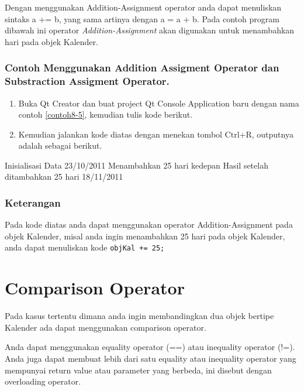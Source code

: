 Dengan menggunakan Addition-Assignment operator anda dapat menuliskan
sintaks a += b, yang sama artinya dengan a = a + b. Pada contoh program
dibawah ini operator \emph{Addition-Assignment} akan digunakan untuk
menambahkan hari pada objek Kalender.

\subsubsection*{Contoh Menggunakan Addition Assigment Operator dan Substraction Assigment Operator.}

\begin{enumerate}

\item
 Buka Qt Creator dan buat project Qt Console Application baru dengan
 nama contoh \ref{contoh8-5}, kemudian tulis kode berikut.




\item
 Kemudian jalankan kode diatas dengan menekan tombol Ctrl+R, outputnya
 adalah sebagai berikut.
\end{enumerate}

\begin{lcverbatim}
Inisialisasi Data
23/10/2011
Menambahkan 25 hari kedepan
Hasil setelah ditambahkan 25 hari
18/11/2011
\end{lcverbatim}

\subsubsection*{Keterangan}

Pada kode diatas anda dapat menggunakan operator Addition-Assignment
pada objek Kalender, misal anda ingin menambahkan 25 hari pada objek
Kalender, anda dapat menuliskan kode \texttt{objKal\ +=\ 25;}

\section{Comparison Operator}\label{comparison-operator}

Pada kasus tertentu dimana anda ingin membandingkan dua objek bertipe
Kalender ada dapat menggunakan comparison operator.



Anda dapat menggunakan equality operator (==) atau inequality operator
(!=). Anda juga dapat membuat lebih dari satu equality atau inequality
operator yang mempunyai return value atau parameter yang berbeda, ini
disebut dengan overloading operator.

